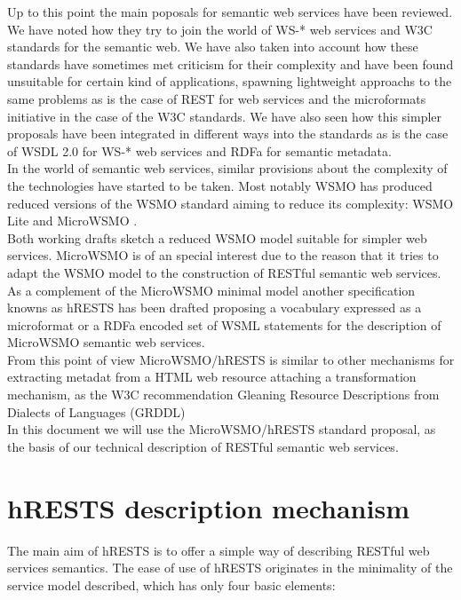 Up to this point the main poposals for semantic web services have been reviewed. We have noted how they try to join the
world of WS-* web services and W3C standards for the semantic web. We have also taken into account how these standards
have sometimes met criticism for their complexity and have been found unsuitable for certain kind of applications,
spawning lightweight approachs to the same problems as is the case of REST for web services and the microformats
initiative in the case of the W3C standards. We have also seen how this simpler proposals have been integrated in
different ways into the standards as is the case of WSDL 2.0 for WS-* web services and RDFa for semantic metadata.\\

In the world of semantic web services, similar provisions about the complexity of the technologies have started to be
taken. Most notably WSMO has produced reduced versions of the WSMO standard aiming to reduce its complexity: WSMO Lite
\cite{wsmolite} and MicroWSMO \cite{microwsmo}.\\

Both working drafts sketch a reduced WSMO model suitable for simpler web services. MicroWSMO is of an special interest
due to the reason that it tries to adapt the WSMO model to the construction of RESTful semantic web services. As a
complement of the MicroWSMO minimal model another specification knowns as hRESTS has been drafted proposing a vocabulary
expressed as a microformat or a RDFa encoded set of WSML statements for the description of MicroWSMO semantic web
services. \\

From this point of view MicroWSMO/hRESTS is similar to other mechanisms for extracting metadat from a HTML web resource
attaching a transformation mechanism, as the W3C recommendation Gleaning Resource Descriptions from Dialects of
Languages (GRDDL) \cite{Connolly:07:GRD}\\

In this document we will use the MicroWSMO/hRESTS standard proposal, as the basis of our technical description of RESTful semantic web services.

\section{hRESTS description mechanism}

The main aim of hRESTS is to offer a simple way of describing RESTful web services semantics. The ease of use of hRESTS originates in the minimality of the service model described, which has only four basic elements:

